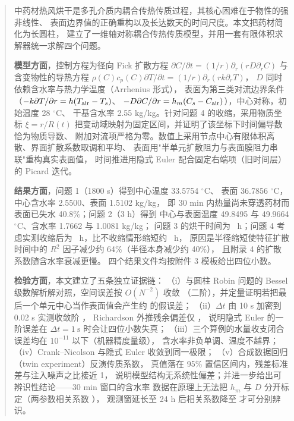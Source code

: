 \begin{abstract}

中药材热风烘干是多孔介质内耦合传热传质过程，其核心困难在于物性的强非线性、
表面边界值的正确重构以及长达数天的时间尺度。本文把药材简化为长圆柱，
建立了一维轴对称耦合传热传质模型，并用一套有限体积求解器统一求解四个问题。

\textbf{模型方面}，控制方程为径向 Fick 扩散方程
$\partial C/\partial t=(1/r)\partial_r(rD\partial_r C)$ 与含变物性的导热方程
$\rho(C)c_p(C)\partial T/\partial t=(1/r)\partial_r(rk\partial_r T)$，
$D$ 同时依赖含水率与热力学温度（Arrhenius 形式），
表面为第三类对流边界条件（$-k\partial T/\partial r=h(\Tair-\Ts)$、
$-D\partial C/\partial r=h_m(\Cs-\Cair)$），中心对称，初始温度 28 $^\circ$C、
干基含水率 2.55 kg/kg。针对问题 4 的收缩，采用物质坐标 $\xi=r/R(t)$
把变动域映射为固定区间，并证明了该坐标下时间偏导数恰为物质导数、
附加对流项严格为零。数值上采用节点中心有限体积离散、界面扩散系数取调和平均、
表面用"半单元扩散阻力与表面膜阻力串联"重构真实表面值，
时间推进用隐式 Euler 配合固定右端项（旧时间层）的 Picard 迭代。

\textbf{结果方面}，问题 1（1800 s）得到中心温度 33.5754 $^\circ$C、
表面 36.7856 $^\circ$C，中心含水率 2.5500、表面 1.5102 kg/kg，
即 30 min 内热量尚未穿透药材而表面已失水 40.8\%；问题 2（3 h）得到
中心与表面温度 49.8495 与 49.9664 $^\circ$C、含水率 1.7662 与 1.0081 kg/kg；
问题 3 的烘干时间为 \ h；问题 4 考虑实测收缩后为
\ h，比不收缩情形缩短约 \ h，
原因是半径缩短使特征扩散时间中的 $R^2$ 因子减少约 64\%（半径本身减少约 40\%），
且附录 4 的扩散系数随含水率衰减更慢。
四个结果文件均按附件 3 模板给出四位小数。

\textbf{检验方面}，本文建立了五条独立证据链：
（i）与圆柱 Robin 问题的 Bessel 级数解析解对照，空间误差按 $O(N^{-2})$ 收敛
（二阶），并定量证明若把最后一个单元中心当作表面值会产生约
 的假误差；
（ii）$\Delta t$ 由 10 s 加密到 0.02 s 实测收敛阶 ，
Richardson 外推残余偏差仅 ，
说明隐式 Euler 的一阶误差在 $\Delta t=1\ \mathrm{s}$ 时会让四位小数失真；
（iii）三个算例的水量收支闭合误差均在 $10^{-11}$ 以下（机器精度量级），
含水率非负单调、温度不越界；
（iv）Crank--Nicolson 与隐式 Euler 收敛到同一极限；
（v）合成数据回归（twin experiment）反演传质系数，
真值落在 95\% 置信区间内，残差标准差与注入噪声之比接近 1，
说明模型结构无系统性偏差；并进一步给出可辨识性结论——30 min 窗口的含水率
数据在原理上无法把 $h_m$ 与 $D$ 分开标定（两参数相关系数 ），
观测窗延长至 24 h 后相关系数降至  才可分别辨识。


\end{abstract}
